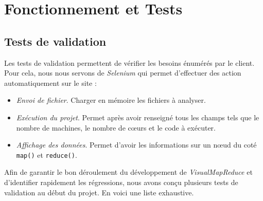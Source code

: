 \chapter{Fonctionnement et Tests}
\section{Tests de validation}

Les tests de validation permettent de vérifier les besoins énumérés par le client. Pour cela, nous nous servons de {\it Selenium} qui permet d'effectuer des action automatiquement sur le site :\\

\begin{itemize}
\item {\it Envoi de fichier}. Charger en mémoire les fichiers à analyser.
\item {\it Exécution du projet}. Permet après avoir renseigné tous les champs tels que le nombre de machines, le nombre de cœurs et le code à exécuter.
\item {\it Affichage des données}. Permet d'avoir les informations sur un nœud du coté {\tt map()} et {\tt reduce()}.\\
\end{itemize}

Afin de garantir le bon déroulement du développement de {\it VisualMapReduce} et d'identifier rapidement les régressions, nous avons conçu plusieurs tests de validation au début du projet. En voici une liste exhaustive.\\


